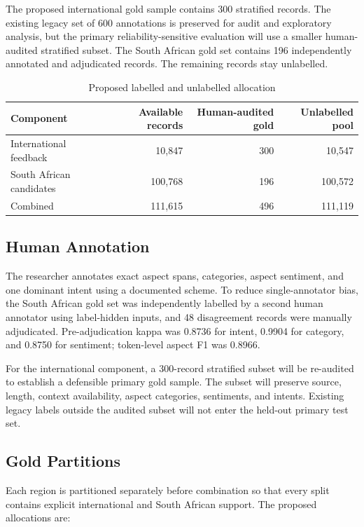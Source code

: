 \documentclass[11pt,a4paper]{article}
\begin{document}
The proposed international gold sample contains 300 stratified records. The existing legacy set of 600 annotations is preserved for audit and exploratory analysis, but the primary reliability-sensitive evaluation will use a smaller human-audited stratified subset. The South African gold set contains 196 independently annotated and adjudicated records. The remaining records stay unlabelled.

\begin{table}[H]
\centering
\caption{Proposed labelled and unlabelled allocation}
\small
\begin{tabular}{p{4.3cm}r r r}
\toprule
\textbf{Component} & \textbf{Available records} & \textbf{Human-audited gold} & \textbf{Unlabelled pool}\\
\midrule
International feedback & 10,847 & 300 & 10,547\\
South African candidates & 100,768 & 196 & 100,572\\
\midrule
Combined & 111,615 & 496 & 111,119\\
\bottomrule
\end{tabular}
\end{table}

\subsection{Human Annotation}
The researcher annotates exact aspect spans, categories, aspect sentiment, and one dominant intent using a documented scheme. To reduce single-annotator bias, the South African gold set was independently labelled by a second human annotator using label-hidden inputs, and 48 disagreement records were manually adjudicated. Pre-adjudication kappa was 0.8736 for intent, 0.9904 for category, and 0.8750 for sentiment; token-level aspect F1 was 0.8966.

For the international component, a 300-record stratified subset will be re-audited to establish a defensible primary gold sample. The subset will preserve source, length, context availability, aspect categories, sentiments, and intents. Existing legacy labels outside the audited subset will not enter the held-out primary test set.

\subsection{Gold Partitions}
Each region is partitioned separately before combination so that every split contains explicit international and South African support. The proposed allocations are:
\end{document}
